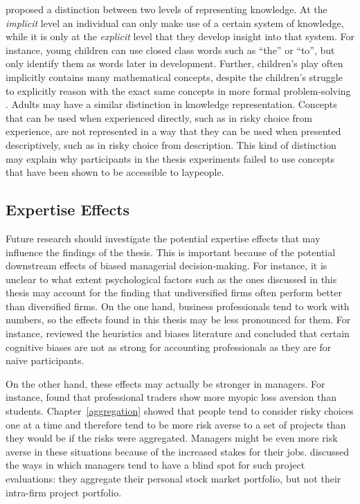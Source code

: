 \documentclass[a4paper, nobind]{templates/ociamthesis}
\theoremstyle{definition}
\theoremstyle{definition}
\theoremstyle{definition}
\theoremstyle{definition}
\theoremstyle{remark}
\begin{document}
\textcite{clark1993} proposed a distinction between two levels of representing knowledge.
At the \emph{implicit} level an individual can only make use of a certain system of
knowledge, while it is only at the \emph{explicit} level that they develop insight
into that system. For instance, young children can use closed class words such
as ``the'' or ``to'', but only identify them as words later in development. Further,
children's play often implicitly contains many mathematical concepts, despite
the children's struggle to explicitly reason with the exact same concepts in
more formal problem-solving \autocite{sarama2009}. Adults may have a similar distinction
in knowledge representation. Concepts that can be used when experienced
directly, such as in risky choice from experience, are not represented in a way
that they can be used when presented descriptively, such as in risky choice from
description. This kind of distinction may explain why participants in the thesis
experiments failed to use concepts that have been shown to be accessible to
laypeople.

\subsection{Expertise Effects}

Future research should investigate the potential expertise effects that may
influence the findings of the thesis. This is important because of the potential
downstream effects of biased managerial decision-making. For instance, it is
unclear to what extent psychological factors such as the ones discussed in this
thesis may account for the finding that undiversified firms often perform better
than diversified firms. On the one hand, business professionals tend to work
with numbers, so the effects found in this thesis may be less pronounced for
them. For instance, \textcite{smith1991} reviewed the heuristics and biases literature and
concluded that certain cognitive biases are not as strong for accounting
professionals as they are for naive participants.

On the other hand, these effects may actually be stronger in managers. For
instance, \textcite{haigh2005} found that professional traders show more myopic loss
aversion than students. Chapter~\ref{aggregation} showed that people tend to
consider risky choices one at a time and therefore tend to be more risk averse
to a set of projects than they would be if the risks were aggregated. Managers
might be even more risk averse in these situations because of the increased
stakes for their jobs. \textcite{lovallo2020} discussed the ways in which managers tend to
have a blind spot for such project evaluations: they aggregate their personal
stock market portfolio, but not their intra-firm project portfolio.
\end{document}
